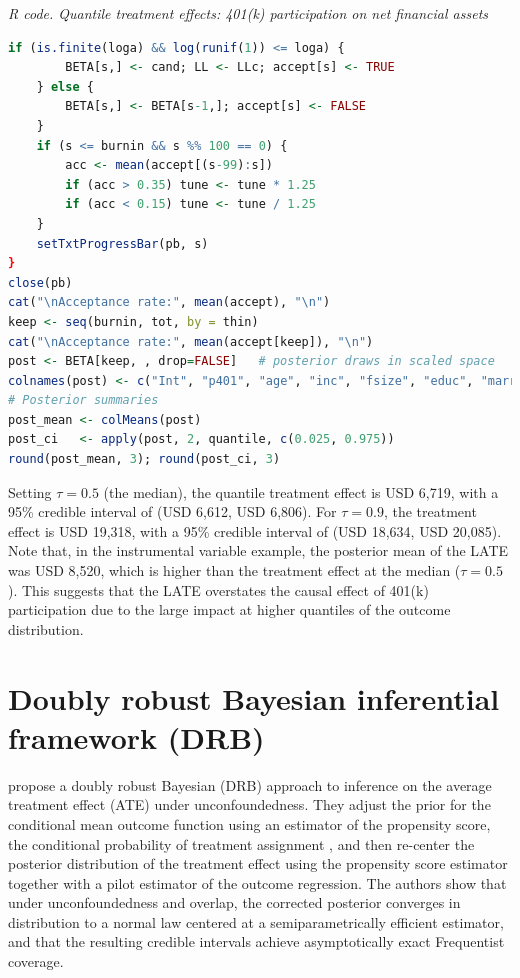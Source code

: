 \begin{tcolorbox}[enhanced,width=4.67in,center upper,
	fontupper=\large\bfseries,drop shadow southwest,sharp corners]
	\textit{R code. Quantile treatment effects: 401(k) participation on net financial assets}
	\begin{VF}
		\begin{lstlisting}[language=R]	
	if (is.finite(loga) && log(runif(1)) <= loga) {
		BETA[s,] <- cand; LL <- LLc; accept[s] <- TRUE
	} else {
		BETA[s,] <- BETA[s-1,]; accept[s] <- FALSE
	}
	if (s <= burnin && s %% 100 == 0) {    
		acc <- mean(accept[(s-99):s])
		if (acc > 0.35) tune <- tune * 1.25
		if (acc < 0.15) tune <- tune / 1.25
	}
	setTxtProgressBar(pb, s)
}
close(pb)
cat("\nAcceptance rate:", mean(accept), "\n")
keep <- seq(burnin, tot, by = thin)
cat("\nAcceptance rate:", mean(accept[keep]), "\n")
post <- BETA[keep, , drop=FALSE]   # posterior draws in scaled space
colnames(post) <- c("Int", "p401", "age", "inc", "fsize", "educ", "marr", "twoearn", "db", "pira", "hown")
# Posterior summaries
post_mean <- colMeans(post)
post_ci   <- apply(post, 2, quantile, c(0.025, 0.975))
round(post_mean, 3); round(post_ci, 3)
		\end{lstlisting}
	\end{VF}
\end{tcolorbox} 

Setting $\tau = 0.5$ (the median), the quantile treatment effect is USD 6,719, with a 95\% credible interval of (USD 6,612, USD 6,806). For $\tau = 0.9$, the treatment effect is USD 19,318, with a 95\% credible interval of (USD 18,634, USD 20,085). Note that, in the instrumental variable example, the posterior mean of the LATE was USD 8,520, which is higher than the treatment effect at the median ($\tau = 0.5$). This suggests that the LATE overstates the causal effect of 401(k) participation due to the large impact at higher quantiles of the outcome distribution.

\section{Doubly robust Bayesian inferential framework (DRB)}\label{sec12_11}

\cite{breunig2025double} propose a doubly robust Bayesian (DRB) approach to inference on the average treatment effect (ATE) under unconfoundedness. They adjust the prior for the conditional mean outcome function using an estimator of the propensity score, the conditional probability of treatment assignment \cite{rosenbaum1983central}, and then re-center the posterior distribution of the treatment effect using the propensity score estimator together with a pilot estimator of the outcome regression. The authors show that under unconfoundedness and overlap, the corrected posterior converges in distribution to a normal law centered at a semiparametrically efficient estimator, and that the resulting credible intervals achieve asymptotically exact Frequentist coverage.

